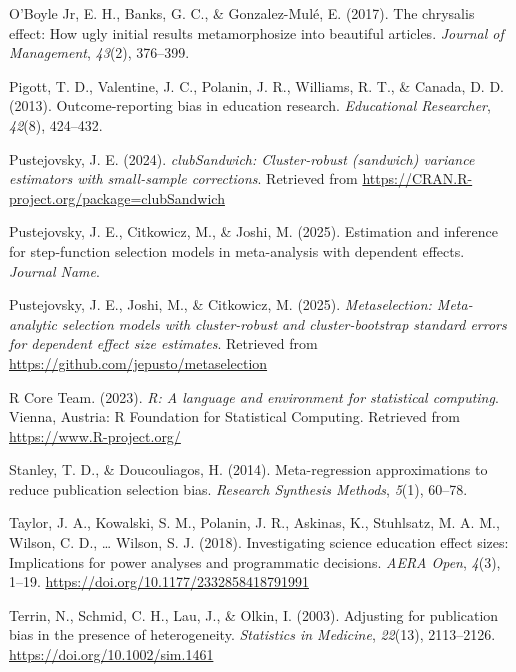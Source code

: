 \documentclass[
  american,
  man, donotrepeattitle,floatsintext]{apa7}
\newlength{\cslhangindent}
\newenvironment{CSLReferences}[2] %
 {\begin{list}{}{%
  \setlength{\itemindent}{0pt}
  \setlength{\leftmargin}{0pt}
  \setlength{\parsep}{0pt}
  \ifodd #1
   \setlength{\leftmargin}{\cslhangindent}
   \setlength{\itemindent}{-1\cslhangindent}
  \fi
  \setlength{\itemsep}{#2\baselineskip}}}
 {\end{list}}
\begin{document}
\begin{CSLReferences}{1}{0}
O'Boyle Jr, E. H., Banks, G. C., \& Gonzalez-Mulé, E. (2017). The chrysalis effect: How ugly initial results metamorphosize into beautiful articles. \emph{Journal of Management}, \emph{43}(2), 376--399.

Pigott, T. D., Valentine, J. C., Polanin, J. R., Williams, R. T., \& Canada, D. D. (2013). Outcome-reporting bias in education research. \emph{Educational Researcher}, \emph{42}(8), 424--432.

Pustejovsky, J. E. (2024). \emph{clubSandwich: Cluster-robust (sandwich) variance estimators with small-sample corrections}. Retrieved from \url{https://CRAN.R-project.org/package=clubSandwich}

Pustejovsky, J. E., Citkowicz, M., \& Joshi, M. (2025). Estimation and inference for step-function selection models in meta-analysis with dependent effects. \emph{Journal Name}.

Pustejovsky, J. E., Joshi, M., \& Citkowicz, M. (2025). \emph{Metaselection: Meta-analytic selection models with cluster-robust and cluster-bootstrap standard errors for dependent effect size estimates}. Retrieved from \url{https://github.com/jepusto/metaselection}

R Core Team. (2023). \emph{R: A language and environment for statistical computing}. Vienna, Austria: R Foundation for Statistical Computing. Retrieved from \url{https://www.R-project.org/}

Stanley, T. D., \& Doucouliagos, H. (2014). Meta-regression approximations to reduce publication selection bias. \emph{Research Synthesis Methods}, \emph{5}(1), 60--78.

Taylor, J. A., Kowalski, S. M., Polanin, J. R., Askinas, K., Stuhlsatz, M. A. M., Wilson, C. D., \ldots{} Wilson, S. J. (2018). Investigating science education effect sizes: Implications for power analyses and programmatic decisions. \emph{AERA Open}, \emph{4}(3), 1--19. \url{https://doi.org/10.1177/2332858418791991}

Terrin, N., Schmid, C. H., Lau, J., \& Olkin, I. (2003). Adjusting for publication bias in the presence of heterogeneity. \emph{Statistics in Medicine}, \emph{22}(13), 2113--2126. \url{https://doi.org/10.1002/sim.1461}


\end{CSLReferences}
\end{document}
